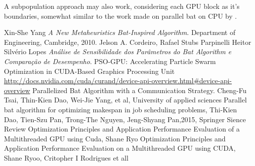 \documentclass[conference]{IEEEtran}
\begin{document}
A subpopulation approach may also work, considering each GPU block as
it's boundaries, somewhat similar to the work made on parallel bat on
CPU by \cite{paralellCPU}.

\begin{thebibliography}{1}
    Xin-She Yang \emph{A New Metaheuristics Bat-Inspired Algorithm}. Department of Engineering, Cambridge, 2010.
    Jelson A. Cordeiro, Rafael Stubs Parpinelli Heitor Silvério Lopes \emph{Análise de Sensibilidade dos Parâmetros do Bat Algorithm e Comparação de Desempenho}.
    PSO-GPU: Accelerating Particle Swarm Optimization in CUDA-Based Graphics Processing Unit
    \url{http://docs.nvidia.com/cuda/curand/device-api-overview.html#device-api-overview}
    Parallelized Bat Algorithm with a Communication Strategy. Cheng-Fu Tsai, Thin-Kien Dao, Wei-Jie Yang, et al, University of applied sciences
    Parallel bat algorithm for optimizing makespan in job scheduling problems, Thi-Kien Dao, Tien-Szu Pan, Trong-The Nguyen, Jeng-Shyang Pan,2015, Springer Sience Review
    Optimization Principles and Application Performance Evaluation of a Multithreaded GPU using Cuda, Shane Ryo
    Optimization Principles and Application Performance Evaluation on a Multithreaded GPU using CUDA, Shane Ryoo, Critopher I Rodrigues et all

\end{thebibliography}
\end{document}
